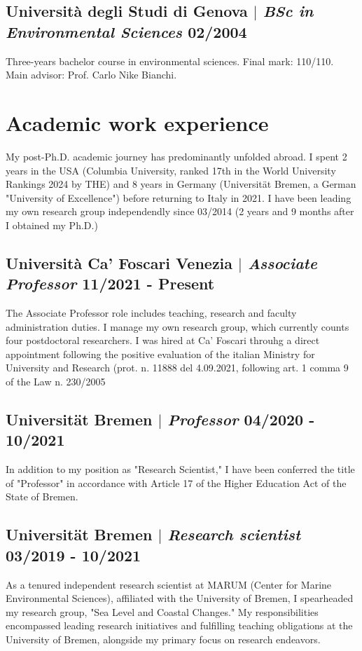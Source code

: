 \documentclass[11pt]{article}
\begin{document}
\subsection{Università degli Studi di Genova $|$ {\normalfont\textit{BSc in Environmental Sciences}} \hfill 02/2004}
{\footnotesize Three-years bachelor course in environmental sciences. Final mark: 110/110. Main advisor: Prof. Carlo Nike Bianchi.}

\section{Academic work experience}
{\normalfont My post-Ph.D. academic journey has predominantly unfolded abroad. I spent 2 years in the USA (Columbia University, ranked 17th in the World University Rankings 2024 by THE) and 8 years in Germany (Universität Bremen, a German "University of Excellence") before returning to Italy in 2021. I have been leading my own research group independendly since 03/2014 (2 years and 9 months after I obtained my Ph.D.)}\\
\bigskip
\subsection{Università Ca' Foscari Venezia  $|$ {\normalfont\textit{Associate Professor}} \hfill 11/2021 - Present}
{\footnotesize The Associate Professor role includes teaching, research and faculty administration duties. I manage my own research group, which currently counts four postdoctoral researchers. I was hired at Ca' Foscari throuhg a direct appointment following the positive evaluation of the italian Ministry for University and Research (prot. n. 11888 del 4.09.2021, following art. 1 comma 9 of the Law n. 230/2005}
\bigskip

\subsection{Universität Bremen  $|$ {\normalfont\textit{Professor}} \hfill 04/2020 - 10/2021}
{\footnotesize In addition to my position as "Research Scientist," I have been conferred the title of "Professor" in accordance with Article 17 of the Higher Education Act of the State of Bremen.}
\bigskip

\subsection{Universität Bremen  $|$ {\normalfont\textit{Research scientist}} \hfill 03/2019 - 10/2021}
{\footnotesize As a tenured independent research scientist at MARUM (Center for Marine Environmental Sciences), affiliated with the University of Bremen, I spearheaded my research group, "Sea Level and Coastal Changes." My responsibilities encompassed leading research initiatives and fulfilling teaching obligations at the University of Bremen, alongside my primary focus on research endeavors.}
\bigskip
\end{document}
